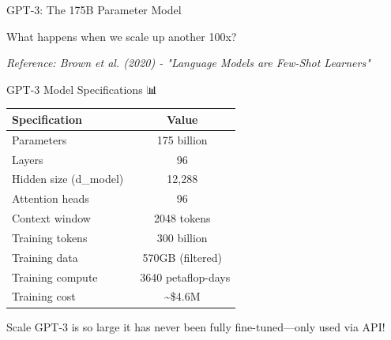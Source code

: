 \documentclass[aspectratio=169]{beamer}
\begin{document}
\begin{frame}{GPT-3: The 175B Parameter Model 🌟}
    \begin{discussion}
        What happens when we scale up another 100x?
    \end{discussion}

    \vspace{0.3cm}

    \begin{center}
    \end{center}

    \vspace{0.3cm}

    \small
    \textit{Reference: Brown et al. (2020) - "Language Models are Few-Shot Learners"}
\end{frame}

\begin{frame}{GPT-3 Model Specifications 📊}
    \begin{table}
        \begin{tabular}{lc}
            \toprule
            \textbf{Specification} & \textbf{Value} \\
            \midrule
            Parameters & 175 billion \\
            Layers & 96 \\
            Hidden size (d\_model) & 12,288 \\
            Attention heads & 96 \\
            Context window & 2048 tokens \\
            Training tokens & 300 billion \\
            Training data & 570GB (filtered) \\
            Training compute & ~3640 petaflop-days \\
            Training cost & \textasciitilde\$4.6M \\
            \bottomrule
        \end{tabular}
    \end{table}

    \vspace{0.3cm}

    \begin{alertblock}{Scale}
        GPT-3 is so large it has never been fully fine-tuned—only used via API!
    \end{alertblock}
\end{frame}
\end{document}
